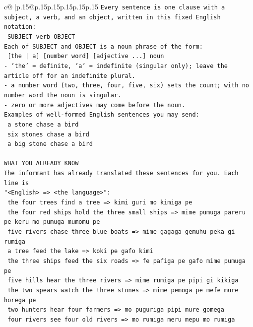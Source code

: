 \documentclass{article}
\begin{document}
{\begin{supertabular}{c@{$\;$}|p{.15\linewidth}@{}p{.15\linewidth}p{.15\linewidth}p{.15\linewidth}p{.15\linewidth}p{.15\linewidth}}
{{{\texttt{Every sentence is one clause with a subject, a verb, and an object, written in this fixed English notation:} \\
\texttt{    SUBJECT  verb  OBJECT} \\
\texttt{Each of SUBJECT and OBJECT is a noun phrase of the form:} \\
\texttt{    {[}the | a{]}  {[}number word{]}  {[}adjective ...{]}  noun} \\
\texttt{{-} 'the' = definite, 'a' = indefinite (singular only); leave the article off for an indefinite plural.} \\
\texttt{{-} a number word (two, three, four, five, six) sets the count; with no number word the noun is singular.} \\
\texttt{{-} zero or more adjectives may come before the noun.} \\
\texttt{Examples of well{-}formed English sentences you may send:} \\
\texttt{    a stone chase a bird} \\
\texttt{    six stones chase a bird} \\
\texttt{    a big stone chase a bird} \\
\\ 
\texttt{WHAT YOU ALREADY KNOW} \\
\texttt{The informant has already translated these sentences for you. Each line is} \\
\texttt{"<English>  =>  <the language>":} \\
\texttt{    the four trees find a tree  =>  kimi guri mo kimiga pe} \\
\texttt{    the four red ships hold the three small ships  =>  mime pumuga pareru pe keru mo pumuga mumomu pe} \\
\texttt{    five rivers chase three blue boats  =>  mime gagaga gemuhu peka gi rumiga} \\
\texttt{    a tree feed the lake  =>  koki pe gafo kimi} \\
\texttt{    the three ships feed the six roads  =>  fe pafiga pe gafo mime pumuga pe} \\
\texttt{    five hills hear the three rivers  =>  mime rumiga pe pipi gi kikiga} \\
\texttt{    the two spears watch the three stones  =>  mime pemoga pe mefe mure horega pe} \\
\texttt{    two hunters hear four farmers  =>  mo puguriga pipi mure gomega} \\
\texttt{    four rivers see four old rivers  =>  mo rumiga meru mepu mo rumiga} \\
}}}
\end{supertabular}}
\end{document}
